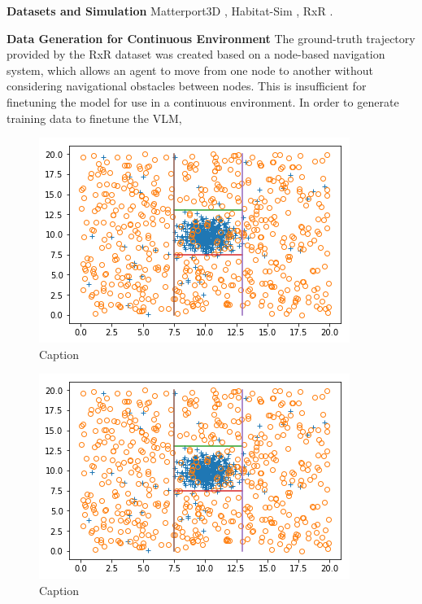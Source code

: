 \documentclass{svproc}
\begin{document}
    \textbf{Datasets and Simulation}  Matterport3D \cite{Matterport3D}, Habitat-Sim \cite{habitat19iccv, szot2021habitat, puig2023habitat3}, RxR \cite{rxr}.

    \textbf{Data Generation for Continuous Environment}  The ground-truth trajectory provided by the RxR dataset was created based on a node-based navigation system, which allows an agent to move from one node to another without considering navigational obstacles between nodes. This is insufficient for finetuning the model for use in a continuous environment. In order to generate training data to finetune the VLM, 

    

    \begin{figure}
        \centering
        \includegraphics[scale=.75]{figures/DecisionBoundary.png}
        \caption{Caption}
        \label{fig:fig2}
    \end{figure}

    
    \begin{figure}
        \centering
        \includegraphics[scale=.75]{figures/DecisionBoundary.png}
        \caption{Caption}
        \label{fig:my_label}
    \end{figure}
\end{document}
